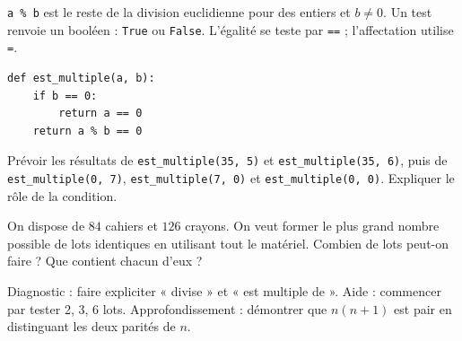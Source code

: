 \begin{method}
\texttt{a \% b} est le reste de la division euclidienne pour des entiers et $b\ne0$. Un test renvoie un booléen : \texttt{True} ou \texttt{False}. L'égalité se teste par \texttt{==} ; l'affectation utilise \texttt{=}.
\end{method}
\begin{lstlisting}
def est_multiple(a, b):
    if b == 0:
        return a == 0
    return a % b == 0
\end{lstlisting}
\begin{example}Prévoir les résultats de \texttt{est\_multiple(35, 5)} et \texttt{est\_multiple(35, 6)}, puis de \texttt{est\_multiple(0, 7)}, \texttt{est\_multiple(7, 0)} et \texttt{est\_multiple(0, 0)}. Expliquer le rôle de la condition.\end{example}
\begin{example}[Problème]On dispose de $84$ cahiers et $126$ crayons. On veut former le plus grand nombre possible de lots identiques en utilisant tout le matériel. Combien de lots peut-on faire ? Que contient chacun d'eux ?\end{example}
\begin{teachernote}Diagnostic : faire expliciter « divise » et « est multiple de ». Aide : commencer par tester 2, 3, 6 lots. Approfondissement : démontrer que $n(n+1)$ est pair en distinguant les deux parités de $n$.\end{teachernote}
